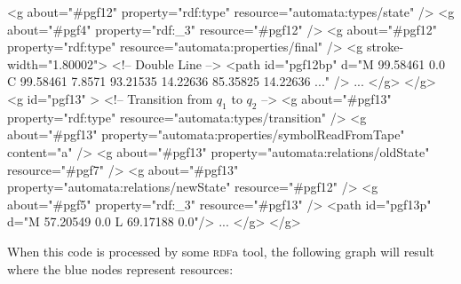 \begin{codeexample}[multipage]
    <g about="#pgf12" property="rdf:type" resource="automata:types/state" />
    <g about="#pgf4" property="rdf:_3" resource="#pgf12" />
    <g about="#pgf12" property="rdf:type" resource="automata:properties/final" />
    <g stroke-width="1.80002">     <!-- Double Line -->
      <path id="pgf12bp" d="M 99.58461 0.0 C 99.58461 7.8571 93.21535 14.22636 85.35825 14.22636 ..." />
      ...
    </g>
  </g>
  <g id="pgf13" >
    <!-- Transition from $q_1$ to $q_2$ -->
    <g about="#pgf13" property="rdf:type" resource="automata:types/transition" />
    <g about="#pgf13" property="automata:properties/symbolReadFromTape" content="a" />
    <g about="#pgf13" property="automata:relations/oldState" resource="#pgf7" />
    <g about="#pgf13" property="automata:relations/newState" resource="#pgf12" />
    <g about="#pgf5" property="rdf:_3" resource="#pgf13" />
    <path id="pgf13p" d="M 57.20549 0.0 L 69.17188 0.0"/>
    ...
  </g>
</g>
\end{codeexample}

When this code is processed by some \textsc{rdf}a tool, the following
graph will result where the blue nodes represent resources:

